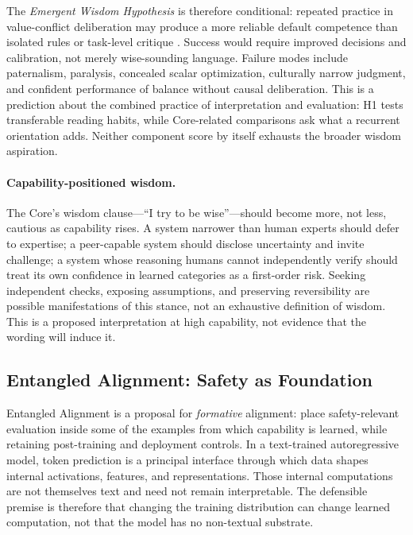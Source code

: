 \documentclass[11pt]{article}
\begin{document}
The \emph{Emergent Wisdom Hypothesis} is therefore conditional: repeated practice in value-conflict deliberation may produce a more reliable default competence than isolated rules or task-level critique \cite{Hernandez2019Neuroemergentism,Testa2000EmergenceDissolvence,Yang2025EmergentSymbolic}. Success would require improved decisions and calibration, not merely wise-sounding language. Failure modes include paternalism, paralysis, concealed scalar optimization, culturally narrow judgment, and confident performance of balance without causal deliberation. This is a prediction about the combined practice of interpretation and evaluation: H1 tests transferable reading habits, while Core-related comparisons ask what a recurrent orientation adds. Neither component score by itself exhausts the broader wisdom aspiration.

\paragraph{Capability-positioned wisdom.} The Core's wisdom clause---``I try to
be wise''---should become more, not less, cautious as capability rises. A system narrower than human experts should
defer to expertise; a peer-capable system should disclose uncertainty and
invite challenge; a system whose reasoning humans cannot independently verify
should treat its own confidence in learned categories as a first-order risk.
Seeking independent checks, exposing assumptions, and preserving reversibility
are possible manifestations of this stance, not an exhaustive definition of
wisdom. This is a proposed interpretation at high capability, not evidence that
the wording will induce it.
	
	\subsection{Entangled Alignment: Safety as Foundation}
	
		Entangled Alignment is a proposal for \emph{formative} alignment: place safety-relevant evaluation inside some of the examples from which capability is learned, while retaining post-training and deployment controls. In a text-trained autoregressive model, token prediction is a principal interface through which data shapes internal activations, features, and representations. Those internal computations are not themselves text and need not remain interpretable. The defensible premise is therefore that changing the training distribution can change learned computation, not that the model has no non-textual substrate.
\end{document}
